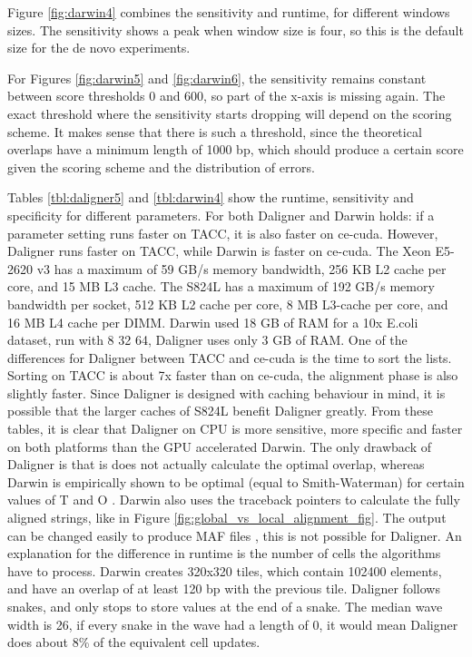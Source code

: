 \documentclass[../thesis.tex]{subfiles}
\begin{document}
Figure \ref{fig:darwin4} combines the sensitivity and runtime, for different windows sizes.
The sensitivity shows a peak when window size is four, so this is the default size for the de novo experiments.

For Figures \ref{fig:darwin5} and \ref{fig:darwin6}, the sensitivity remains constant between score thresholds 0 and 600, so part of the x-axis is missing again.
The exact threshold where the sensitivity starts dropping will depend on the scoring scheme.
It makes sense that there is such a threshold, since the theoretical overlaps have a minimum length of 1000 bp, which should produce a certain score given the scoring scheme and the distribution of errors.

Tables \ref{tbl:daligner5} and \ref{tbl:darwin4} show the runtime, sensitivity and specificity for different parameters.
For both Daligner and Darwin holds: if a parameter setting runs faster on TACC, it is also faster on ce-cuda.
However, Daligner runs faster on TACC, while Darwin is faster on ce-cuda.
The Xeon E5-2620 v3 has a maximum of 59 GB/s memory bandwidth, 256 KB L2 cache per core, and 15 MB L3 cache.
The S824L has a maximum of 192 GB/s memory bandwidth per socket, 512 KB L2 cache per core, 8 MB L3-cache per core, and 16 MB L4 cache per DIMM.
Darwin used 18 GB of RAM for a 10x E.coli dataset, run with 8 32 64, Daligner uses only 3 GB of RAM.
One of the differences for Daligner between TACC and ce-cuda is the time to sort the lists.
Sorting on TACC is about 7x faster than on ce-cuda, the alignment phase is also slightly faster.
Since Daligner is designed with caching behaviour in mind, it is possible that the larger caches of S824L benefit Daligner greatly.
From these tables, it is clear that Daligner on CPU is more sensitive, more specific and faster on both platforms than the GPU accelerated Darwin.
The only drawback of Daligner is that is does not actually calculate the optimal overlap, whereas Darwin is empirically shown to be optimal (equal to Smith-Waterman) for certain values of T and O \cite{Darwin2}.
Darwin also uses the traceback pointers to calculate the fully aligned strings, like in Figure \ref{fig:global_vs_local_alignment_fig}.
The output can be changed easily to produce MAF files \cite{MAF}, this is not possible for Daligner.
An explanation for the difference in runtime is the number of cells the algorithms have to process.
Darwin creates 320x320 tiles, which contain 102400 elements, and have an overlap of at least 120 bp with the previous tile.
Daligner follows snakes, and only stops to store values at the end of a snake.
The median wave width is 26, if every snake in the wave had a length of 0, it would mean Daligner does about 8\% of the equivalent cell updates.
\end{document}
